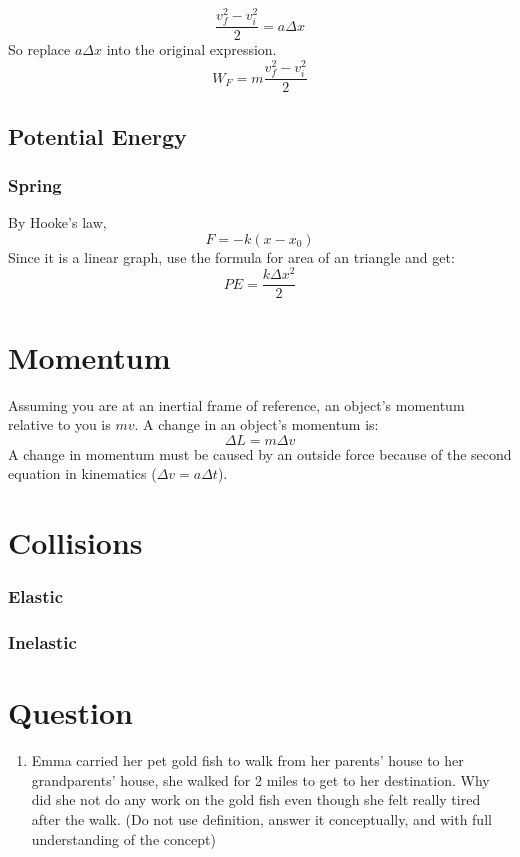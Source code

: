 \documentclass[]{article}
\begin{document}
	$$\frac{v_f^2 - v^2_i}{2} = a\Delta x$$
	So replace $a\Delta x$ into the original expression.
	$$W_F = m \frac{v_f^2 - v^2_i}{2}$$
	
	\subsection{Potential Energy}
		\subsubsection{Spring}
			By Hooke's law, 
			$$F = -k (x-x_0)$$
			Since it is a linear graph, use the formula for area of an triangle and get:
				$$PE = \frac{k\Delta x^2}{2}$$	

		
\section{Momentum}
Assuming you are at an inertial frame of reference, an object's momentum relative to you is $mv$. A change in an object's momentum is:
$$\Delta L = m \Delta v$$
A change in momentum must be caused by an outside force because of the second equation in kinematics ($\Delta v = a\Delta t$).

\section{Collisions}
\subsubsection{Elastic}
\subsubsection{Inelastic}


\section{Question}
\begin{enumerate}
	\item Emma carried her pet gold fish to walk from her parents' house to her grandparents' house, she walked for 2 miles to get to her destination. Why did she not do any work on the gold fish even though she felt really tired after the walk. (Do not use definition, answer it conceptually, and with full understanding of the concept)
\end{enumerate}
\end{document}
